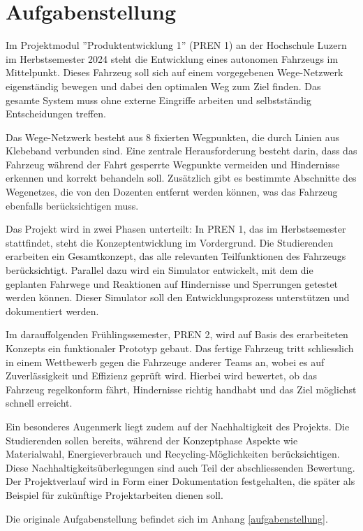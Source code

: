 \documentclass[../main.tex]{subfiles}
\begin{document}
\newpage
\section{Aufgabenstellung}
Im Projektmodul ''Produktentwicklung 1'' (PREN 1) an der Hochschule Luzern im Herbstsemester 2024 steht die Entwicklung eines autonomen Fahrzeugs im Mittelpunkt. Dieses Fahrzeug soll sich auf einem vorgegebenen Wege-Netzwerk eigenständig bewegen und dabei den optimalen Weg zum Ziel finden. Das gesamte System muss ohne externe Eingriffe arbeiten und selbstständig Entscheidungen treffen. 

Das Wege-Netzwerk besteht aus 8 fixierten Wegpunkten, die durch Linien aus Klebeband verbunden sind. Eine zentrale Herausforderung besteht darin, dass das Fahrzeug während der Fahrt gesperrte Wegpunkte vermeiden und Hindernisse erkennen und korrekt behandeln soll. Zusätzlich gibt es bestimmte Abschnitte des Wegenetzes, die von den Dozenten entfernt werden können, was das Fahrzeug ebenfalls berücksichtigen muss. 

Das Projekt wird in zwei Phasen unterteilt: In PREN 1, das im Herbstsemester stattfindet, steht die Konzeptentwicklung im Vordergrund. Die Studierenden erarbeiten ein Gesamtkonzept, das alle relevanten Teilfunktionen des Fahrzeugs berücksichtigt. Parallel dazu wird ein Simulator entwickelt, mit dem die geplanten Fahrwege und Reaktionen auf Hindernisse und Sperrungen getestet werden können. Dieser Simulator soll den Entwicklungsprozess unterstützen und dokumentiert werden. 

Im darauffolgenden Frühlingssemester, PREN 2, wird auf Basis des erarbeiteten Konzepts ein funktionaler Prototyp gebaut. Das fertige Fahrzeug tritt schliesslich in einem Wettbewerb gegen die Fahrzeuge anderer Teams an, wobei es auf Zuverlässigkeit und Effizienz geprüft wird. Hierbei wird bewertet, ob das Fahrzeug regelkonform fährt, Hindernisse richtig handhabt und das Ziel möglichst schnell erreicht. 

Ein besonderes Augenmerk liegt zudem auf der Nachhaltigkeit des Projekts. Die Studierenden sollen bereits, während der Konzeptphase Aspekte wie Materialwahl, Energieverbrauch und Recycling-Möglichkeiten berücksichtigen. Diese Nachhaltigkeitsüberlegungen sind auch Teil der abschliessenden Bewertung. Der Projektverlauf wird in Form einer Dokumentation festgehalten, die später als Beispiel für zukünftige Projektarbeiten dienen soll.

Die originale Aufgabenstellung befindet sich im Anhang \ref{aufgabenstellung}.
\end{document}
